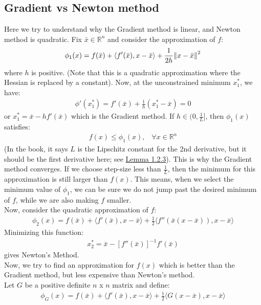 \documentclass[12pt,a4paper]{article}
\begin{document}
	 \subsection*{Gradient vs Newton method}
	 Here we try to understand why the Gradient method is linear, and Newton method is quadratic.
	 Fix $\bar{x} \in \mathbb{R}^n$ and consider the approximation of $f$:
	 \begin{align*}
	 	\phi_1(x) = f(\bar{x}) + \langle f'(\bar{x}), x - \bar{x} \rangle + \frac{1}{2h}\norm{x - \bar{x}}^2
	 \end{align*}
	where $h$ is positive. (Note that this is a quadratic approximation where the Hessian is replaced by a constant). Now, at the unconstrained minimum $x_1^*$, we have:
	\begin{align*}
		\phi'(x_1^*) = f'(\bar{x}) + \frac{1}{h}(x_1^* - \bar{x}) = 0
	\end{align*}
	or $x_1^* = \bar{x} - hf'(\bar{x})$ which is the Gradient method. If $h \in (0, \frac{1}{L}]$, then $\phi_1(x)$ satisfies:
	\begin{align*}
		f(x) \leq \phi_1(x), \hspace{10pt} \forall x \in \mathbb{R}^n
	\end{align*}
	(In the book, it says $L$ is the Lipschitz constant for the 2nd derivative, but it should be the first derivative here; see \hyperref[lem123]{Lemma 1.2.3}). This is why the Gradient method converges. If we choose step-size less than $\frac{1}{L}$, then the minimum for this approximation is still larger than $f(x)$. This means, when we select the minimum value of $\phi_1$, we can be sure we do not jump past the desired minimum of $f$, while we are also making $f$ smaller.\\
	Now, consider the quadratic approximation of $f$:
	\begin{align*}
		\phi_2(x) = f(\bar{x}) + \langle f'(\bar{x}), x - \bar{x} \rangle + \frac{1}{2}\langle f''(\bar{x}(x-\bar{x})), x - \bar{x} \rangle 
	\end{align*}
	Minimizing this function:
	\begin{align*}
		x_2^* = \bar{x} - [f''(\bar{x})]^{-1}f'(\bar{x})
	\end{align*}
	gives Newton's Method. \\
	Now, we try to find an approximation for $f(x)$ which is better than the Gradient method, but less expensive than Newton's method. \\
	Let $G$ be a positive definite $n$ x $n$ matrix and define:
	\begin{align*}
		\phi_G(x) = f(\bar{x}) + \langle f'(\bar{x}), x - \bar{x} \rangle + \frac{1}{2}\langle G(x - \bar{x}), x - \bar{x} \rangle 
	\end{align*}
\end{document}
